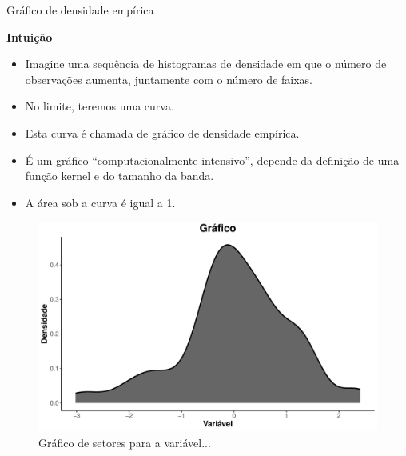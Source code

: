 \documentclass[
  ignorenonframetext,
  serif,
  professionalfont,
  usenames,
  dvipsnames,
  aspectratio = 169]{beamer}
\def\beginAHalfColumn{\begin{minipage}{0.49\textwidth}}%
\def\endColumns{\end{minipage}}%
\begin{document}
\begin{frame}{Gráfico de densidade empírica}
\protect\hypertarget{gruxe1fico-de-densidade-empuxedrica}{}
\beginAHalfColumn

\textbf{Intuição}

\begin{itemize}
\item
  Imagine uma sequência de histogramas de densidade em que o número de
  observações aumenta, juntamente com o número de faixas.
\item
  No limite, teremos uma curva.
\item
  Esta curva é chamada de gráfico de densidade empírica.
\item
  É um gráfico ``computacionalmente intensivo'', depende da definição de
  uma função kernel e do tamanho da banda.
\item
  A área sob a curva é igual a 1.
\end{itemize}

\endColumns
\beginAHalfColumn

\begin{figure}

{\centering \includegraphics[width=1\linewidth]{200-exploratoria-uni-tabelas-graficos_files/figure-beamer/unnamed-chunk-23-1} 

}

\caption{Gráfico de setores para a variável...}\label{fig:unnamed-chunk-23}
\end{figure}

\endColumns
\end{frame}
\end{document}
